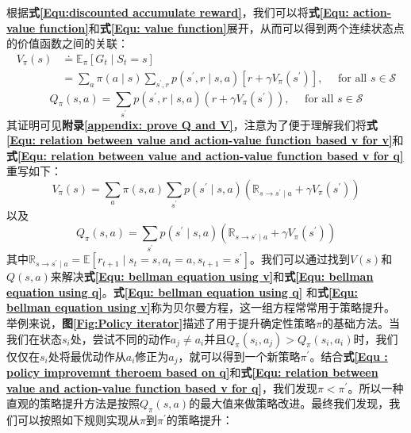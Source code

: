 根据\textbf{式\eqref{Equ:discounted accumulate reward}}，我们可以将\textbf{式\eqref{Equ: action-value function}}和\textbf{式\eqref{Equ: value function}}展开，从而可以得到两个连续状态点的价值函数之间的关联：
\begin{equation}
\label{Equ: relation between value and action-value function based v for v}
    \begin{aligned}
V_{\pi}(s) & \doteq \mathbb{E}_{\pi}\left[G_{t} \mid S_{t}=s\right] \\
&=\sum_{a} \pi(a \mid s) \sum_{s^{\prime}, r} p\left(s^{\prime}, r \mid s, a\right)\left[r+\gamma V_{\pi}\left(s^{\prime}\right)\right], \quad \text { for all } s \in \mathcal{S}
\end{aligned}
\end{equation}
\begin{equation}
\label{Equ: relation between value and action-value function based v for q}
    Q_{\pi}(s, a)=\sum_{s^{\prime}} p\left(s^{\prime}, r \mid s, a\right)\left(r+\gamma V_{\pi}\left(s^{\prime}\right)\right)
    , \quad \text { for all } s \in \mathcal{S}
\end{equation}
其证明可见\textbf{附录\ref{appendix: prove Q and V}}，注意为了便于理解我们将\textbf{式\eqref{Equ: relation between value and action-value function based v for v}}和\textbf{式\eqref{Equ: relation between value and action-value function based v for q}}重写如下：
\begin{equation}
\label{Equ: bellman equation using v}
    V_{\pi}(s)=\sum_{a} \pi(s, a) \sum_{s^{\prime}} p\left(s^{\prime} \mid s, a\right)\left(\mathbb{R}_{s \rightarrow s^{\prime} \mid a}+\gamma V_{\pi}\left(s^{\prime}\right)\right)
\end{equation}
以及
\begin{equation}
\label{Equ: bellman equation using q}
    Q_{\pi}(s, a)=\sum_{s^{\prime}} p\left(s^{\prime} \mid s, a\right)\left(\mathbb{R}_{s \rightarrow s^{\prime} \mid a}+\gamma V_{\pi}\left(s^{\prime}\right)\right)
\end{equation}
其中$\mathbb{R}_{s \rightarrow s^{\prime} \mid a}=\mathbb{E}\left[r_{t+1} \mid s_{t}=s, a_{t}=a, s_{t+1}=s^{\prime}\right]$。我们可以通过找到$V(s)$和$Q(s,a)$来解决\textbf{式\eqref{Equ: bellman equation using v}}和\textbf{式\eqref{Equ: bellman equation using q}}。\textbf{式\eqref{Equ: bellman equation using q}}
和\textbf{式\eqref{Equ: bellman equation using v}}称为贝尔曼方程，这一组方程常常用于策略提升。举例来说，\textbf{图\ref{Fig:Policy iterator}}描述了用于提升确定性策略$\pi$的基础方法。当我们在状态$s_i$处，尝试不同的动作$a_j \neq a_i$并且$Q_{\pi}\left(s_{i}, a_{j}\right)>Q_{\pi}\left(s_{i}, a_{i}\right)$时，我们仅仅在$s_i$处将最优动作从$a_i$修正为$a_j$，就可以得到一个新策略$\pi^{\prime}$。结合\textbf{式\eqref{Equ : policy improvemnt theroem based on q}}和\textbf{式\eqref{Equ: relation between value and action-value function based v for q}}，我们发现$\pi < \pi^{\prime}$。所以一种直观的策略提升方法是按照$Q_\pi(s,a)$的最大值来做策略改进。最终我们发现，我们可以按照如下规则实现从$\pi$到$\pi^{\prime}$的策略提升：
